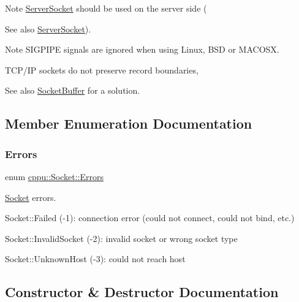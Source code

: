 \begin{DoxyNote}{Note}
\mbox{\hyperlink{classcppu_1_1_server_socket}{Server\+Socket}} should be used on the server side (
\end{DoxyNote}
\begin{DoxySeeAlso}{See also}
\mbox{\hyperlink{classcppu_1_1_server_socket}{Server\+Socket}}). 
\end{DoxySeeAlso}
\begin{DoxyNote}{Note}
S\+I\+G\+P\+I\+PE signals are ignored when using Linux, B\+SD or M\+A\+C\+O\+SX. 

T\+C\+P/\+IP sockets do not preserve record boundaries, 
\end{DoxyNote}
\begin{DoxySeeAlso}{See also}
\mbox{\hyperlink{classcppu_1_1_socket_buffer}{Socket\+Buffer}} for a solution. 
\end{DoxySeeAlso}


\subsection{Member Enumeration Documentation}
\mbox{\label{classcppu_1_1_socket_a49ea5cb079bd7ae97ecf7eb30c9d9e5f}} 
\subsubsection{\texorpdfstring{Errors}{Errors}}
{\footnotesize\ttfamily enum \mbox{\hyperlink{classcppu_1_1_socket_a49ea5cb079bd7ae97ecf7eb30c9d9e5f}{cppu\+::\+Socket\+::\+Errors}}}



\mbox{\hyperlink{classcppu_1_1_socket}{Socket}} errors. 


\begin{DoxyItemize}
\item Socket\+::\+Failed (-\/1)\+: connection error (could not connect, could not bind, etc.)
\item Socket\+::\+Invalid\+Socket (-\/2)\+: invalid socket or wrong socket type
\item Socket\+::\+Unknown\+Host (-\/3)\+: could not reach host 
\end{DoxyItemize}

\subsection{Constructor \& Destructor Documentation}
\mbox{\label{classcppu_1_1_socket_ae73b9b629fe443f650203d938f61a279}} 
